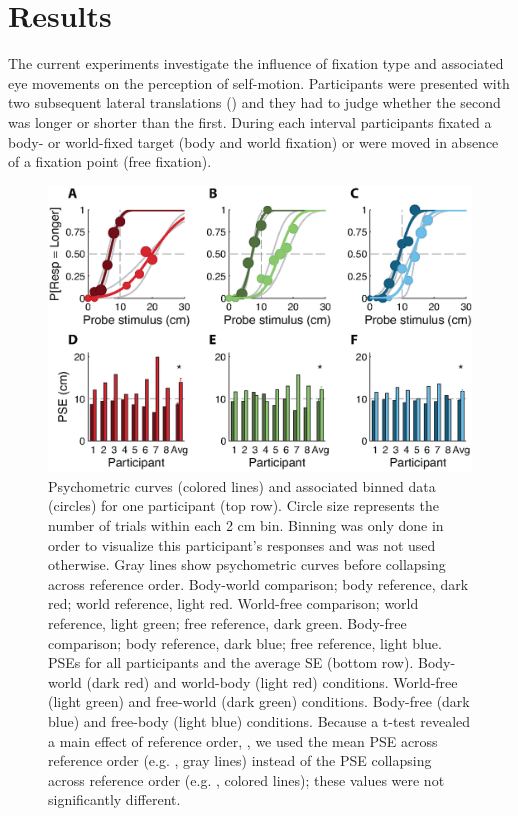 \section{Results}

The current experiments investigate the influence of fixation type and associated eye movements on the perception of self-motion. Participants were presented with two subsequent lateral translations () and they had to judge whether the second was longer or shorter than the first. During each interval participants fixated a body- or world-fixed target (body and world fixation) or were moved in absence of a fixation point (free fixation).

\begin{figure}
    \includegraphics[width=1.0\textwidth]{src/paper3/figure2.eps}

    \caption{Psychometric curves (colored lines) and associated binned data (circles) for one participant (top row). Circle size represents the number of trials within each 2 \si{\centi\metre} bin. Binning was only done in order to visualize this participant's responses and was not used otherwise. Gray lines show psychometric curves before collapsing across reference order.  Body-world comparison; body reference, dark red; world reference, light red.  World-free comparison; world reference, light green; free reference, dark green.   Body-free comparison; body reference, dark blue; free reference, light blue. \newline    
PSEs for all participants and the average {\textpm}SE (bottom row).  Body-world (dark red) and world-body (light red) conditions.  World-free (light green) and free-world (dark green) conditions.  Body-free (dark blue) and free-body (light blue) conditions. Because a t-test revealed a main effect of reference order, , we used the mean PSE across reference order (e.g. , gray lines) instead of the PSE collapsing across reference order (e.g. , colored lines); these values were not significantly different.}
    \label{p3:fig2}    
\end{figure}

